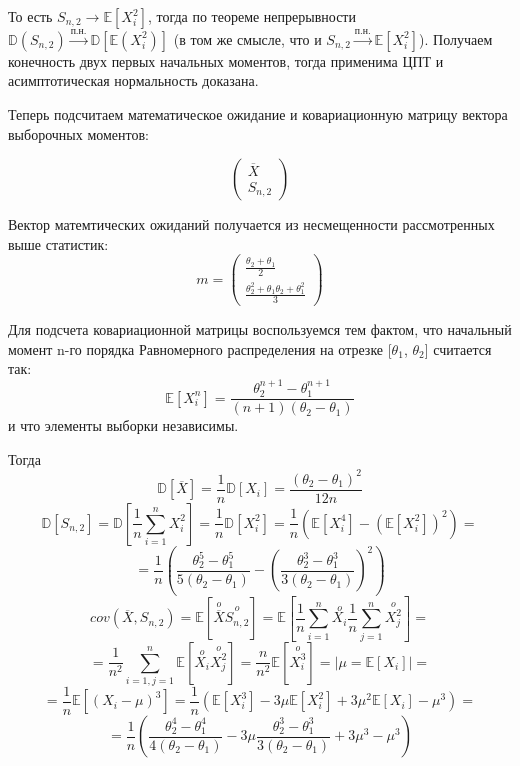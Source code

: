 \documentclass{article}
\begin{document}
То есть $S_{n,2}\to\mathbb{E}[X_i^2]$, тогда по теореме непрерывности 
$\mathbb{D}(S_{n,2})\xrightarrow{\text{п.н.}}\mathbb{D}\left[\mathbb{E}(X_i^2)\right]$ (в том же смысле, что и
$S_{n,2}\xrightarrow{\text{п.н.}}\mathbb{E}[X_i^2]$). 
Получаем конечность двух первых начальных моментов, тогда применима ЦПТ и асимптотическая нормальность доказана.

Теперь подсчитаем математическое ожидание и ковариационную матрицу вектора выборочных моментов:

\[\begin{pmatrix} \overline{X} \\ S_{n,2} \end{pmatrix}\]

Вектор матемтических ожиданий получается из несмещенности рассмотренных выше статистик:
\[m = \begin{pmatrix}
	\frac{\theta_2+\theta_1}{2}\\
	\frac{\theta_2^2+\theta_1\theta_2+\theta_1^2}{3}
\end{pmatrix}\]

Для подсчета ковариационной матрицы воспользуемся тем фактом, что начальный момент n-го порядка Равномерного распределения на отрезке [$\theta_1$, $\theta_2$] считается так:
\[\mathbb{E}[X_i^n] = \frac{\theta_2^{n+1} - \theta_1^{n+1}}{(n+1)(\theta_2-\theta_1)}\]
и что элементы выборки независимы.

Тогда 
\[\textbf{$\mathbb{D}[\overline{X}]$} = \frac{1}{n}\mathbb{D}[X_i] = \frac{(\theta_2-\theta_1)^2}{12n}\]
\[\textbf{$\mathbb{D}[S_{n,2}]$} = \mathbb{D}\left[\frac{1}{n}\sum_{i=1}^{n}X_i^2\right] = \frac{1}{n}\mathbb{D}[X_i^2] = \frac{1}{n}\left(\mathbb{E}[X_i^4]-\left(\mathbb{E}[X_i^2]\right)^2\right)=\]
\[=\frac{1}{n}\left(\frac{\theta_2^5-\theta_1^5}{5(\theta_2-\theta_1)}-\left(\frac{\theta_2^{3} - \theta_1^{3}}{3(\theta_2-\theta_1)}\right)^2\right)\]
\[\textbf{$cov(\overline{X}, S_{n,2})$} = \mathbb{E}\left[\stackrel{o}{\overline{X}}\stackrel{o}{S_{n,2}}\right]=\mathbb{E}\left[\frac{1}{n}\sum_{i=1}^{n}\stackrel{o}{X_i}\frac{1}{n}\sum_{j=1}^{n}\stackrel{o}{X_j^2}\right]=\]
\[=\frac{1}{n^2}\sum_{i=1,j=1}^{n}\mathbb{E}\left[\stackrel{o}{X_i}\stackrel{o}{X_j^2}\right]=\frac{n}{n^2}\mathbb{E}\left[\stackrel{o}{X_i^3}\right]=\left|\mu = \mathbb{E}[X_i]\right|=\]
\[=\frac{1}{n}\mathbb{E}\left[(X_i-\mu)^3\right]=\frac{1}{n}\left(\mathbb{E}[X_i^3]-3\mu\mathbb{E}[X_i^2]+3\mu^2\mathbb{E}[X_i]-\mu^3\right)=\]
\[=\frac{1}{n}\left(\frac{\theta_2^{4} - \theta_1^{4}}{4(\theta_2-\theta_1)}-3\mu\frac{\theta_2^{3} - \theta_1^{3}}{3(\theta_2-\theta_1)}+3\mu^3-\mu^3\right)\]
\end{document}
